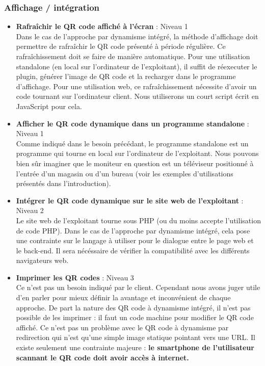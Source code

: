 \documentclass[a4paper,12pt]{article}
\begin{document}
\subsubsection{Affichage / intégration}

\begin{itemize}
  
  \item \textbf{Rafraîchir le QR code affiché à l'écran} : Niveau 1\\
  Dans le cas de l'approche par dynamisme intégré, la méthode d'affichage doit permettre de rafraîchir le QR code présenté à période régulière. Ce rafraîchissement doit se faire de manière automatique. Pour une utilisation standalone (en local sur l'ordinateur de l'exploitant), il suffit de réexecuter le plugin, générer l'image de QR code et la recharger dans le programme d'affichage. Pour une utilisation web, ce rafraîchissement nécessite d'avoir un code tournant sur l'ordinateur client. Nous utiliserons un court script écrit en JavaScript pour cela.\\
  
  \item \textbf{Afficher le QR code dynamique dans un programme standalone} : Niveau 1\\
  Comme indiqué dans le besoin précédant, le programme standalone est un programme qui tourne en local sur l'ordinateur de l'exploitant. Nous pouvons bien sûr imaginer que le moniteur en question est un téléviseur positionné à l'entrée d'un magasin ou d'un bureau (voir les exemples d'utilisations présentés dans l'introduction).\\

  \item \textbf{Intégrer le QR code dynamique sur le site web de l'exploitant} : Niveau 2\\
  Le site web de l'exploitant tourne sous PHP (ou du moins accepte l'utilisation de code PHP). Dans le cas de l'approche par dynamisme intégré, cela pose une contrainte sur le langage à utiliser pour le dialogue entre le page web et le back-end. Il sera nécéssaire de vérifier la compatibilité avec les différents navigateurs web.\\
  
  \item \textbf{Imprimer les QR codes} : Niveau 3\\
  Ce n'est pas un besoin indiqué par le client. Cependant nous avons juger utile d'en parler pour mieux définir la avantage et inconvénient de chaque approche. De part la nature des QR code à dynamisme intégré, il n'est pas possible de les imprimer : il faut un code machine pour modifier le QR code affiché. Ce n'est pas un problème avec le QR code à dynamisme par redirection qui n'est qu'une simple image statique pointant vers une URL. Il existe seulement une contrainte majeure : \textbf{le smartphone de l'utilisateur scannant le QR code doit avoir accès à internet.}\\
  

\end{itemize}
\end{document}
